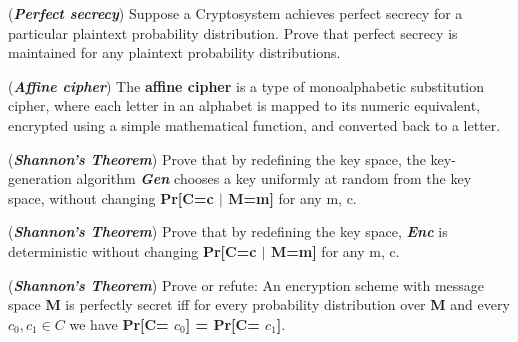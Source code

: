 \documentclass[11pt]{exam}
\begin{document}
\begin{questions}
\question[10] ({\bf \textit{Perfect secrecy}}) 
Suppose a Cryptosystem achieves perfect secrecy for a particular plaintext probability distribution. Prove that perfect secrecy is maintained for any plaintext probability distributions.

\question[10] ({\bf \textit{Affine cipher}}) 
The \textbf{affine cipher} is a type of monoalphabetic substitution cipher, where each letter in an alphabet is mapped to its numeric equivalent, encrypted using a simple mathematical function, and converted back to a letter.

\question[10] ({\bf \textit{Shannon's Theorem}}) 
Prove that by redefining the key space, the key-generation algorithm \textbf{\textit{Gen}} chooses a key uniformly at random from the key space, without changing \textbf{Pr[C=c $\mid$ M=m]} for any m, c.

\question[10] ({\bf \textit{Shannon's Theorem}}) 
Prove that by redefining the key space, \textbf{\textit{Enc}} is deterministic without changing \textbf{Pr[C=c $\mid$ M=m]} for any m, c. 

\question[10] ({\bf \textit{Shannon's Theorem}}) 
Prove or refute: An encryption scheme with message space \textbf{M} is perfectly secret iff for every probability distribution over \textbf{M} and every $c_0, c_1 \in C$  we have \textbf{ Pr[C= \boldmath $c_0$] = Pr[C= $c_1$]}. 

\end{questions}
\end{document}
